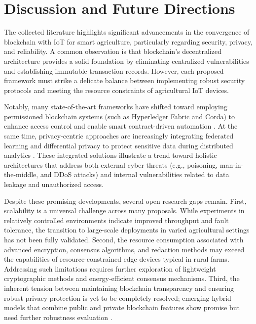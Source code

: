 \documentclass[12pt,onecolumn]{IEEEtran} %
\begin{document}
\section{Discussion and Future Directions}
The collected literature highlights significant advancements in the convergence of blockchain with IoT for smart agriculture, particularly regarding security, privacy, and reliability. A common observation is that blockchain's decentralized architecture provides a solid foundation by eliminating centralized vulnerabilities and establishing immutable transaction records. However, each proposed framework must strike a delicate balance between implementing robust security protocols and meeting the resource constraints of agricultural IoT devices.

Notably, many state-of-the-art frameworks have shifted toward employing permissioned blockchain systems (such as Hyperledger Fabric and Corda) to enhance access control and enable smart contract-driven automation \cite{aliyu2023blockchainbasedsmartfarm, soy2025blockchainintegrationin}. At the same time, privacy-centric approaches are increasingly integrating federated learning and differential privacy to protect sensitive data during distributed analytics \cite{daund2025designofan}. These integrated solutions illustrate a trend toward holistic architectures that address both external cyber threats (e.g., poisoning, man-in-the-middle, and DDoS attacks) and internal vulnerabilities related to data leakage and unauthorized access.

Despite these promising developments, several open research gaps remain. First, scalability is a universal challenge across many proposals. While experiments in relatively controlled environments indicate improved throughput and fault tolerance, the transition to large-scale deployments in varied agricultural settings has not been fully validated. Second, the resource consumption associated with advanced encryption, consensus algorithms, and redaction methods may exceed the capabilities of resource-constrained edge devices typical in rural farms. Addressing such limitations requires further exploration of lightweight cryptographic methods and energy-efficient consensus mechanisms. Third, the inherent tension between maintaining blockchain transparency and ensuring robust privacy protection is yet to be completely resolved; emerging hybrid models that combine public and private blockchain features show promise but need further robustness evaluation \cite{soy2025blockchainintegrationin}.
\end{document}
